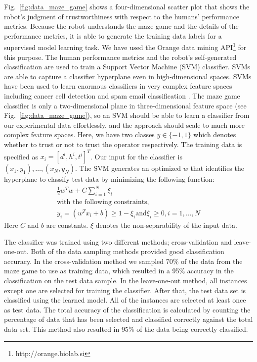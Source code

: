\documentclass{sig-alternate}
\begin{document}
Fig.~\ref{fig:data_maze_game} shows a four-dimensional scatter plot
that shows the robot's judgment of trustworthiness with respect to the
humans' performance metrics.  Because the robot understands the maze
game and the details of the performance metrics, it is able to
generate the training data labels for a supervised model learning
task.  We have used the Orange data mining
API\footnote{http://orange.biolab.si} for this purpose.  The human
performance metrics and the robot's self-generated classification are
used to train a Support Vector Machine (SVM) classifier.  SVMs are
able to capture a classifier hyperplane even in high-dimensional
spaces. SVMs have been used to learn enormous classifiers in very
complex feature spaces including cancer cell detection and spam email
classification \cite{guyon2002gene, drucker1999support}.  The maze
game classifier is only a two-dimensional plane in three-dimensional
feature space (see Fig.~\ref{fig:data_maze_game}), so an SVM should be
able to learn a classifier from our experimental data effortlessly,
and the approach should scale to much more complex feature spaces.
Here, we have two classes $y\in\{-1,1\} $ which denotes whether to
trust or not to trust the operator respectively.  The training data is
specified as $x_i = [d^i, h^i, t^i]^T$. Our input for the
classifier is $(x_1,y_1), \ldots,(x_N,y_N)$. The SVM generates an
optimized $w$ that identifies the hyperplane to classify test data by
minimizing the following function:
\begin{equation*}
\begin{array}{ccc}
\frac{1}{2}w^{T}w + C\sum _{i=1}^N \xi _i \\
\text{with the following constraints,} \\
y_{i} = (w^{T}x_{i} + b)\geq 1-\xi_{i} \text{and} \xi_{i}\geq 0, i=1,...,N
\end{array}
\end{equation*}
Here $C $ and $b $ are constants. $\xi $ denotes the non-separability
of the input data.

The classifier was trained using two different methods;
cross-validation and leave-one-out.  Both of the data sampling methods
provided good classification accuracy. In the cross-validation method
we sampled 70\% of the data from the maze game to use as training
data, which resulted in a 95\% accuracy in the classification on the
test data sample. In the leave-one-out method, all instances except
one are selected for training the classifier. After that, the test
data set is classified using the learned model. All of the instances
are selected at least once as test data. The total accuracy of the
classification is calculated by counting the percentage of data that
has been selected and classified correctly against the total data
set. This method also resulted in 95\% of the data being correctly
classified.
\end{document}
